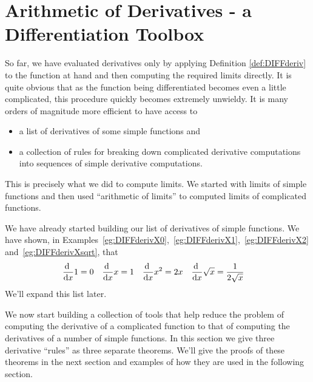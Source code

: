 \section{Arithmetic of Derivatives - a Differentiation Toolbox}

So far, we have evaluated derivatives only by applying
Definition \ref{def:DIFFderiv} to the function at hand and then computing the
required limits directly. It is quite obvious that as the function being
differentiated becomes even a little complicated, this procedure quickly becomes
extremely unwieldy. It is many orders of magnitude more efficient to have
access to
\begin{itemize}
\item a list of derivatives of some simple functions and
\item a collection of rules for breaking down complicated derivative computations
   into sequences of simple derivative computations.
\end{itemize}
This is precisely what we did to compute limits. We started with limits of
simple functions and then used ``arithmetic of limits'' to computed limits of
complicated functions.

We have already started building our list of derivatives of simple
functions. We have shown, in
Examples~\ref{eg:DIFFderivX0},~\ref{eg:DIFFderivX1},~\ref{eg:DIFFderivX2}
and~\ref{eg:DIFFderivXsqrt}, that
\begin{align*}
\diff{}{x} 1 &= 0 &
\diff{}{x} x &= 1 &
\diff{}{x} x^2 &= 2x &
\diff{}{x} \sqrt{x} &= \frac{1}{2\sqrt{x}}
\end{align*}
We'll expand this list later.

We now start building a collection of tools that help reduce the problem of computing the
derivative of a complicated function to that of computing the derivatives of a number of
simple functions. In this section we give three derivative ``rules'' as three separate
theorems. We'll give the proofs of these theorems in the next section and examples
of how they are used in the following section.

